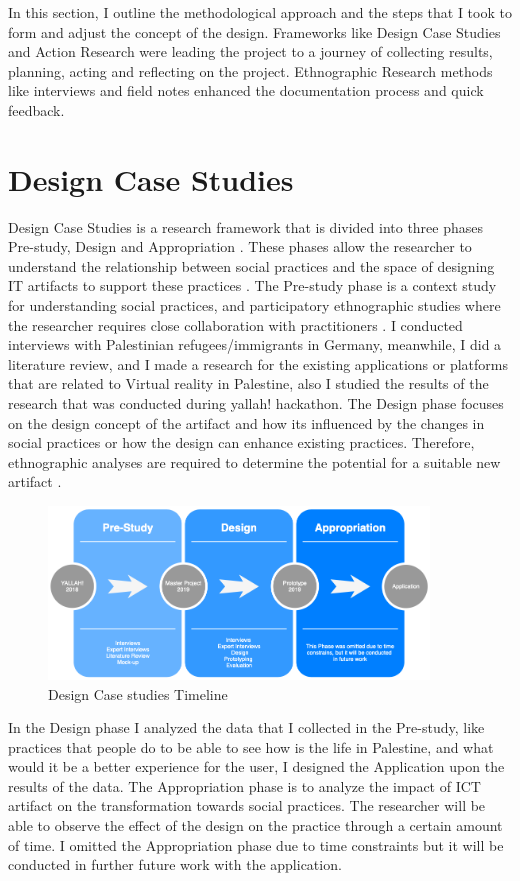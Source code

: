 In this section, I outline the methodological approach and the steps that I took to form and adjust the concept of the design. Frameworks like Design Case Studies and Action Research were leading the project to a journey of collecting results, planning, acting and reflecting on the project. Ethnographic Research methods like interviews and field notes enhanced the documentation process and quick feedback. 

\section{Design Case Studies}

Design Case Studies is a research framework that is divided into three phases Pre-study, Design and Appropriation \citep{Wulf2011}. These phases allow the researcher to understand the relationship between social practices and the space of designing IT artifacts to support these practices \citep{Volker2013}. The Pre-study phase is a context study for understanding social practices, and participatory ethnographic studies where the researcher requires close collaboration with practitioners \citep{Rohde2017GroundedPerspective, Wulf2011}. I conducted interviews with Palestinian refugees/immigrants in Germany, meanwhile, I did a literature review, and I made a research for the existing applications or platforms that are related to Virtual reality in Palestine, also I studied the results of the research that was conducted during \acrfull{yallah!} hackathon. The Design phase focuses on the design concept of the artifact and how its influenced by the changes in social practices or how the design can enhance existing practices. Therefore, ethnographic analyses are required to determine the potential for a suitable new artifact \citep{Rohde2017GroundedPerspective, Wulf2011}.
\begin{figure}[ht]
    \centering
    \includegraphics[width=0.90\textwidth]{images/DCS_Diagram.png}
    \caption{Design Case studies Timeline}
    \label{fig:dcs}
\end{figure}
In the Design phase I analyzed the data that I collected in the Pre-study, like practices that people do to be able to see how is the life in Palestine, and what would it be a better experience for the user, I designed the Application upon the results of the data. The Appropriation phase is to analyze the impact of ICT artifact on the transformation towards social practices\citep{Wulf2011}. The researcher will be able to observe the effect of the design on the practice through a certain amount of time. I omitted the Appropriation phase due to time constraints but it will be conducted in further future work with the application.   


